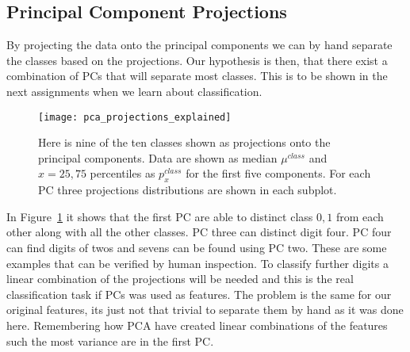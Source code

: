 \subsection{Principal Component Projections}
By projecting the data onto the principal components we can by hand separate the classes based on the projections. Our hypothesis is then, that there exist a combination of PCs that will separate most classes. This is to be shown in the next assignments when we learn about classification.

\begin{figure}[H]
\centering
\texttt{[image: pca\_projections\_explained]}
\caption{Here is nine of the ten classes shown as projections onto the principal components. Data are shown as median $\mu^{class}$ and $x={25,75}$ percentiles as $p_{x}^{class}$ for the first five components. For each PC three projections distributions are shown in each subplot. \label{fig:pca_projections_explained}}
\end{figure}

In Figure~\ref{fig:pca_projections_explained} it shows that the first PC are able to distinct class ${0,1}$ from each other along with all the other classes. PC three can distinct digit four. PC four can find digits of twos and sevens can be found using PC two. These are some examples that can be verified by human inspection. To classify further digits a linear combination of the projections will be needed and this is the real classification task if PCs was used as features. The problem is the same for our original features, its just not that trivial to separate them by hand as it was done here. Remembering how PCA have created linear combinations of the features such the most variance are in the first PC. 
